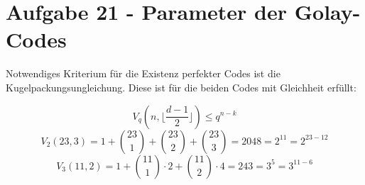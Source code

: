 \section*{Aufgabe 21 - Parameter der Golay-Codes}
Notwendiges Kriterium für die Existenz perfekter Codes ist die
Kugelpackungsungleichung. Diese ist für die beiden Codes mit Gleichheit
erfüllt:

\[ V_q(n, \lfloor\frac{d-1}{2}\rfloor) \leq q^{n-k} \]
\[ V_2(23, 3) = 1 + \binom{23}{1} + \binom{23}{2} + \binom{23}{3} = 2048 = 2^{11} = 2^{23-12} \]
\[ V_3(11, 2) = 1 + \binom{11}{1} \cdot 2 + \binom{11}{2}\cdot 4 = 243 = 3^{5} = 3^{11-6} \]
